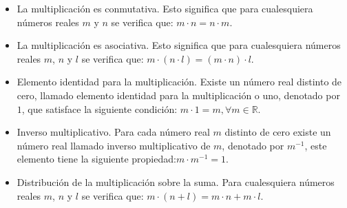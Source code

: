 \documentclass[11pt]{article}
\newcommand{\R}{\mathbb{R}}
\begin{document}
\begin{itemize}
    \item La multiplicación es conmutativa. Esto significa que para cualesquiera números reales $m$ y $n$ se verifica que: $ m \cdot n = n \cdot m $.
    \item La multiplicación es asociativa. Esto significa que para cualesquiera números reales $m$, $n$ y $l$ se verifica que: $ m \cdot (n \cdot l) = (m \cdot n) \cdot l $.
    \item Elemento identidad para la multiplicación. Existe un número real distinto de cero, llamado elemento identidad para la multiplicación o uno, denotado por $1$, que satisface la siguiente condición: $ m \cdot 1 = m,\forall m \in \R $.
    \item Inverso multiplicativo. Para cada número real $m$ distinto de cero existe un número real llamado inverso multiplicativo de $m$, denotado por $m^{-1}$, este elemento tiene la siguiente propiedad:$m \cdot m^{-1} = 1$.
    \item Distribución de la multiplicación sobre la suma. Para cualesquiera números reales $m$, $n$ y $l$ se verifica que: $ m \cdot (n+l)=m \cdot n+m \cdot l $.
\end{itemize}
\end{document}
